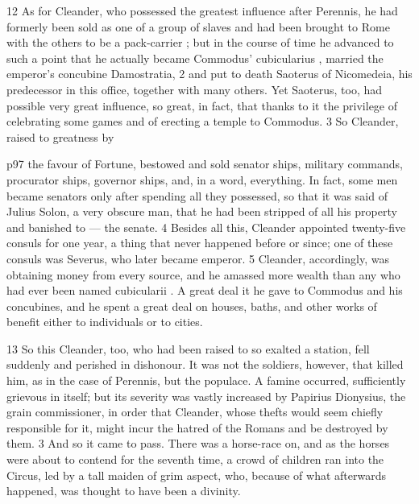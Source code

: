 12
As for Cleander, who possessed the greatest influence after Perennis, he had formerly been sold as one of a group of slaves and had been brought to Rome with the others to be a pack-carrier ; but in the course of time he advanced to such a point that he actually became Commodus' cubicularius , married the emperor's concubine Damostratia, 2 and put to death Saoterus of Nicomedeia, his predecessor in this office, together with many others. Yet Saoterus, too, had possible very great influence, so great, in fact, that thanks to it the privilege of celebrating some games and of erecting a temple to Commodus. 3 So Cleander, raised to greatness by

p97 the favour of Fortune, bestowed and sold senator ­ships, military commands, procurator ­ships, governor ­ships, and, in a word, everything. In fact, some men became senators only after spending all they possessed, so that it was said of Julius Solon, a very obscure man, that he had been stripped of all his property and banished to \texthebrew{—} the senate. 4 Besides all this, Cleander appointed twenty-five consuls for one year, a thing that never happened before or since; one of these consuls was Severus, who later became emperor. 5 Cleander, accordingly, was obtaining money from every source, and he amassed more wealth than any who had ever been named cubicularii . A great deal it he gave to Commodus and his concubines, and he spent a great deal on houses, baths, and other works of benefit either to individuals or to cities.

13
So this Cleander, too, who had been raised to so exalted a station, fell suddenly and perished in dishonour. It was not the soldiers, however, that killed him, as in the case of Perennis, but the populace. A famine occurred, sufficiently grievous in itself; but its severity was vastly increased by Papirius Dionysius, the grain commissioner, in order that Cleander, whose thefts would seem chiefly responsible for it, might incur the hatred of the Romans and be destroyed by them. 3 And so it came to pass. There was a horse-race on, and as the horses were about to contend for the seventh time, a crowd of children ran into the Circus, led by a tall maiden of grim aspect, who, because of what afterwards happened, was thought to have been a divinity.

